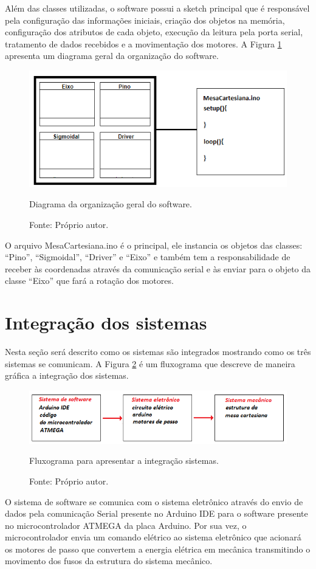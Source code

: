 Além das classes utilizadas, o software possui a sketch principal que é responsável pela configuração das 
informações iniciais, criação dos objetos na memória, configuração dos atributos de cada objeto, execução 
da leitura pela porta serial, tratamento de dados recebidos e a movimentação dos motores.
A Figura \ref{fig:orgsoftware} apresenta um diagrama geral da organização do software.

\begin{figure}[!htb]
\centering
\includegraphics[scale = 0.85]{figuras/3-22}
\caption{Diagrama da organização geral do software.}
\caption*{Fonte: Próprio autor.}
\label{fig:orgsoftware}
\end{figure}
    
O arquivo MesaCartesiana.ino é o principal, ele instancia os objetos das classes: “Pino”, “Sigmoidal”, 
“Driver” e “Eixo” e também tem a responsabilidade de receber às coordenadas através da comunicação serial 
e às enviar para o objeto da classe “Eixo” que fará a rotação dos motores.

\section{Integração dos sistemas}\label{subsec:metintegracao}

Nesta seção será descrito como os sistemas são integrados mostrando como os três sistemas se comunicam. 
A Figura \ref{fig:integracao} é um fluxograma que descreve de maneira gráfica a integração dos sistemas.

\begin{figure}[!htb]
\centering
\includegraphics[scale = 0.9]{figuras/3-23}
\caption{Fluxograma para apresentar a integração sistemas.}
\caption*{Fonte: Próprio autor.}
\label{fig:integracao}
\end{figure}
    
O sistema de software se comunica com o sistema eletrônico através do envio de dados pela comunicação 
Serial presente no Arduino IDE para o software presente no microcontrolador ATMEGA da placa Arduino. 
Por sua vez, o microcontrolador envia um comando elétrico ao sistema eletrônico que acionará os motores 
de passo que convertem a energia elétrica em mecânica transmitindo o movimento dos fusos da estrutura do 
sistema mecânico.